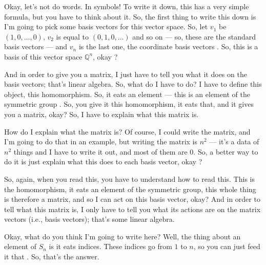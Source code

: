 \begin{speech}[00:08:02 - 00:09:57]
Okay, let's not do words. In symbols! To write it down, this has a very simple formula, but you have to think about it. So, the first thing to write this down is I'm going to pick some basis vectors for this vector space. So, let $v_1$ be $(1, 0, \dots, 0)$, $v_2$ is equal to $(0, 1, 0, \dots)$ and so on --- so, these are the standard basis vectors --- and $v_n$ is the last one, the coordinate basis vectors . So, this is a basis of this vector space $\mathbb{Q}^n$, okay ?

And in order to give you a matrix, I just have to tell you what it does on the basis vectors; that's linear algebra. So, what do I have to do? I have to define this object, this homomorphism. So, it eats an element --- this is an element of the symmetric group . So, you give it this homomorphism, it eats that, and it gives you a matrix, okay? So, I have to explain what this matrix is.

How do I explain what the matrix is? Of course, I could write the matrix, and I'm going to do that in an example, but writing the matrix is $n^2$ --- it's a data of $n^2$ things and I have to write it out, and most of them are $0$. So, a better way to do it is just explain what this does to each basis vector, okay ?

So, again, when you read this, you have to understand how to read this. This is the homomorphism, it eats an element of the symmetric group, this whole thing is therefore a matrix, and so I can act on this basis vector, okay? And in order to tell what this matrix is, I only have to tell you what its actions are on the matrix vectors (i.e., basis vectors); that's some linear algebra.

Okay, what do you think I'm going to write here? Well, the thing about an element of $S_n$ is it eats indices. These indices go from $1$ to $n$, so you can just feed it that . So, that's the answer.
\end{speech}

